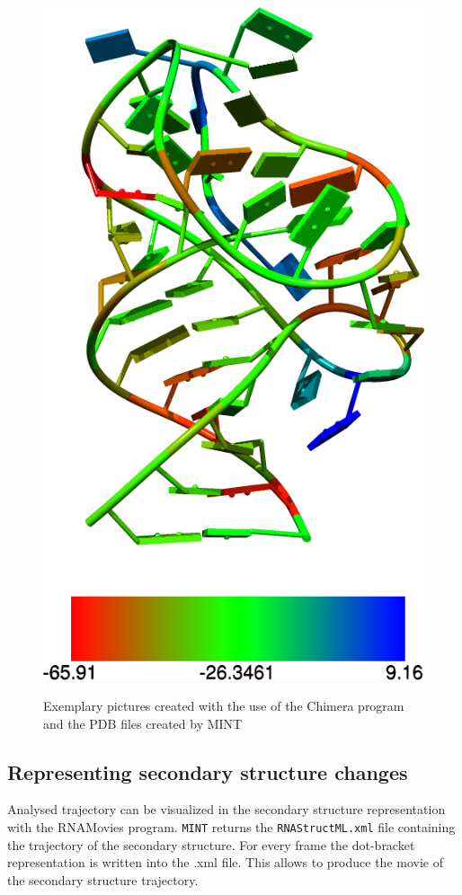\documentclass[12pt]{article}
\begin{document}
\begin{figure}[!h]
{\includegraphics[scale=0.22]{./pictures/chimera-stacking.png}}
\hspace*{\fill}%
\caption{Exemplary pictures created with the use of the Chimera program and the PDB files created by MINT}
\label{chimera-pictures}
\end{figure}

\newpage
\subsection{Representing secondary structure changes} 
Analysed trajectory can be visualized in the secondary structure representation with the RNAMovies \cite{Evers1999} program. {\tt MINT} returns the {\tt RNAStructML.xml} file containing the trajectory of the secondary structure. For every frame the dot-bracket representation is written into the .xml file. This allows to produce the movie of the secondary structure trajectory. 
\end{document}
